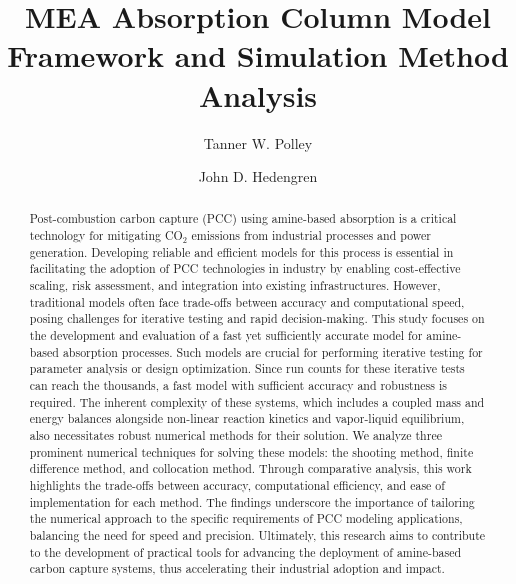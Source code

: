 \documentclass[a4paper,fleqn]{cas-sc}
\begin{document}
    \let\WriteBookmarks\relax
    \def\floatpagepagefraction{1}
    \def\textpagefraction{.001}



    \title [mode = title]{MEA Absorption Column Model Framework and Simulation Method Analysis}

    \author[1]{Tanner W. Polley}
    \author[2]{John D. Hedengren}


    \begin{abstract}
        Post-combustion carbon capture (PCC) using amine-based absorption is a critical technology for mitigating CO$_2$ emissions from industrial processes and power generation. Developing reliable and efficient models for this process is essential in facilitating the adoption of PCC technologies in industry by enabling cost-effective scaling, risk assessment, and integration into existing infrastructures. However, traditional models often face trade-offs between accuracy and computational speed, posing challenges for iterative testing and rapid decision-making. This study focuses on the development and evaluation of a fast yet sufficiently accurate model for amine-based absorption processes. Such models are crucial for performing iterative testing for parameter analysis or design optimization. Since run counts for these iterative tests can reach the thousands, a fast model with sufficient accuracy and robustness is required. The inherent complexity of these systems, which includes a coupled mass and energy balances alongside non-linear reaction kinetics and vapor-liquid equilibrium, also necessitates robust numerical methods for their solution. We analyze three prominent numerical techniques for solving these models: the shooting method, finite difference method, and collocation method. Through comparative analysis, this work highlights the trade-offs between accuracy, computational efficiency, and ease of implementation for each method. The findings underscore the importance of tailoring the numerical approach to the specific requirements of PCC modeling applications, balancing the need for speed and precision. Ultimately, this research aims to contribute to the development of practical tools for advancing the deployment of amine-based carbon capture systems, thus accelerating their industrial adoption and impact.
    \end{abstract}
\end{document}
